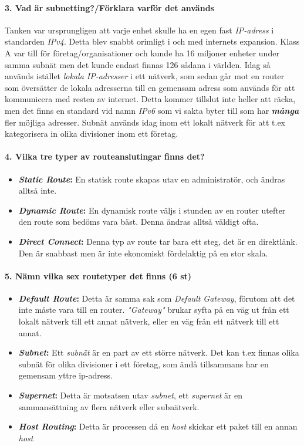 \paragraph{3. Vad är subnetting?/Förklara varför det används}
Tanken var ursprungligen att varje enhet skulle ha en egen fast \textit{IP-adress} i standarden \textit{IPv4}. Detta blev snabbt orimligt i och med internets expansion. Klass A var till för företag/organisationer och kunde ha 16 miljoner enheter under samma subnät men det kunde endast finnas 126 sådana i världen. Idag så används istället \textit{lokala IP-adresser} i ett nätverk, som sedan går mot en router som översätter de lokala adresserna till en gemensam adress som används för att kommunicera med resten av internet. Detta kommer tillslut inte heller att räcka, men det finns en standard vid namn \textit{IPv6} som vi sakta byter till som har \textbf{\textit{många}} fler möjliga adresser. Subnät används idag inom ett lokalt nätverk för att t.ex kategorisera in olika divisioner inom ett företag.

\paragraph{4. Vilka tre typer av routeanslutingar finns det?}

\begin{itemize}
	\item \textbf{\textit{Static Route}:} En statisk route skapas utav en administratör, och ändras alltså inte.
	\item \textbf{\textit{Dynamic Route}:} En dynamisk route väljs i stunden av en router utefter den route som bedöms vara  bäst. Denna ändras alltså väldigt ofta.
	\item \textbf{\textit{Direct Connect}:} Denna typ av route tar bara ett steg, det är en direktlänk. Den är snabbast men är inte ekonomiskt fördelaktig på en stor skala.
\end{itemize}
 
\paragraph{5. Nämn vilka sex routetyper det finns (6 st)}

\begin{itemize}
	\item \textbf{\textit{Default Route}:} Detta är samma sak som \textit{Default Gateway}, förutom att det inte måste vara till en router. \textit{"Gateway"} brukar syfta på en väg ut från ett lokalt nätverk till ett annat nätverk, eller en väg från ett nätverk till ett annat.
	\item \textbf{\textit{Subnet}:} Ett \textit{subnät} är en part av ett större nätverk. Det kan t.ex finnas olika subnät för olika divisioner i ett företag, som ändå tillsammans har en gemensam yttre ip-adress.
	\item \textbf{\textit{Supernet}:} Detta är motsatsen utav \textit{subnet}, ett \textit{supernet} är en sammansättning av flera nätverk eller subnätverk. 
	\item \textbf{\textit{Host Routing}:} Detta är processen då en \textit{host} skickar ett paket till en annan \textit{host}
\end{itemize}


